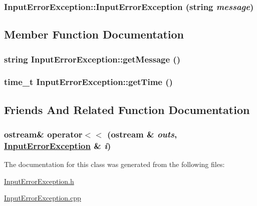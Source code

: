 \hypertarget{class_input_error_exception_a5b055150d69a2f34306d7e593da629f}{
\subsubsection[InputErrorException]{\setlength{\rightskip}{0pt plus 5cm}Input\-Error\-Exception::Input\-Error\-Exception (string {\em message})}}
\label{class_input_error_exception_a5b055150d69a2f34306d7e593da629f}




\subsection{Member Function Documentation}
\hypertarget{class_input_error_exception_d3115ba6a009eec3cfb9fdc7af4c7fdb}{
\subsubsection[getMessage]{\setlength{\rightskip}{0pt plus 5cm}string Input\-Error\-Exception::get\-Message ()}}
\label{class_input_error_exception_d3115ba6a009eec3cfb9fdc7af4c7fdb}


\hypertarget{class_input_error_exception_63b6711a881165ec2d91d06d02a6d6a6}{
\subsubsection[getTime]{\setlength{\rightskip}{0pt plus 5cm}time\_\-t Input\-Error\-Exception::get\-Time ()}}
\label{class_input_error_exception_63b6711a881165ec2d91d06d02a6d6a6}




\subsection{Friends And Related Function Documentation}
\hypertarget{class_input_error_exception_632247cf1d4273fe4755d4592fa85784}{
\subsubsection[operator$<$$<$]{\setlength{\rightskip}{0pt plus 5cm}ostream\& operator$<$$<$ (ostream \& {\em outs}, \hyperlink{class_input_error_exception}{Input\-Error\-Exception} \& {\em i})}}
\label{class_input_error_exception_632247cf1d4273fe4755d4592fa85784}




The documentation for this class was generated from the following files:\begin{CompactItemize}
\item 
\hyperlink{_input_error_exception_8h}{Input\-Error\-Exception.h}\item 
\hyperlink{_input_error_exception_8cpp}{Input\-Error\-Exception.cpp}\end{CompactItemize}
